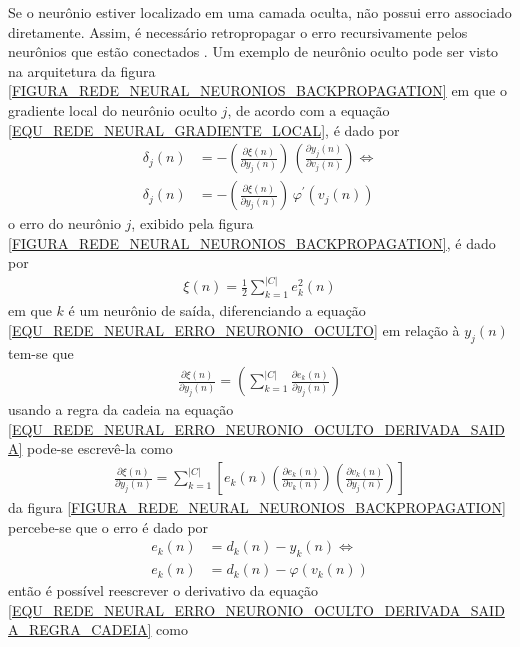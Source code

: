 Se o neurônio estiver localizado em uma camada oculta, não possui erro associado diretamente. Assim, é necessário retropropagar o erro recursivamente pelos neurônios que estão conectados \cite{Haykin2007}. Um exemplo de neurônio oculto pode ser visto na arquitetura da figura \ref{FIGURA_REDE_NEURAL_NEURONIOS_BACKPROPAGATION} em que o gradiente local do neurônio oculto \(j\), de acordo com a equação \eqref{EQU_REDE_NEURAL_GRADIENTE_LOCAL}, é dado por
\begin{align}
\delta_{j}(n) &= - \left( \frac{\partial \xi(n)}{\partial y_{j}(n)} \right) \, \left( \frac{\partial y_{j}(n)}{\partial v_{j}(n)} \right) \Leftrightarrow \label{EQU_REDE_NEURAL_GRADIENTE_LOCAL_CASO2}\\
\delta_{j}(n) &= - \left( \frac{\partial \xi(n)}{\partial y_{j}(n)} \right) \, \varphi^{'}(v_{j}(n))
\end{align}
o erro do neurônio \(j\), exibido pela figura \ref{FIGURA_REDE_NEURAL_NEURONIOS_BACKPROPAGATION}, é dado por
\begin{align}
\xi(n) = \frac{1}{2} \sum\limits_{k = 1}^{|C|} e_{k}^{2}(n) \label{EQU_REDE_NEURAL_ERRO_NEURONIO_OCULTO}
\end{align}
em que \(k\) é um neurônio de saída, diferenciando a equação \eqref{EQU_REDE_NEURAL_ERRO_NEURONIO_OCULTO} em relação à \(y_{j}(n)\) tem-se que
\begin{align}
\frac{\partial \xi(n)}{\partial y_{j}(n)} =  \left( \sum\limits_{k = 1}^{|C|} \frac{\partial e_{k}(n)}{\partial y_{j}(n)} \right)  \label{EQU_REDE_NEURAL_ERRO_NEURONIO_OCULTO_DERIVADA_SAIDA}
\end{align}
usando a regra da cadeia na equação \eqref{EQU_REDE_NEURAL_ERRO_NEURONIO_OCULTO_DERIVADA_SAIDA} pode-se escrevê-la como
\begin{align}
\frac{\partial \xi(n)}{\partial y_{j}(n)} = \sum\limits_{k = 1}^{|C|} \left[ e_{k}(n) \left( \frac{\partial e_{k}(n)}{\partial v_{k}(n)} \right) \left( \frac{\partial v_{k}(n)}{\partial y_{j}(n)} \right) \right]  \label{EQU_REDE_NEURAL_ERRO_NEURONIO_OCULTO_DERIVADA_SAIDA_REGRA_CADEIA}
\end{align}
da figura \ref{FIGURA_REDE_NEURAL_NEURONIOS_BACKPROPAGATION} percebe-se que o erro é dado por
\begin{align}
e_{k}(n) &= d_{k}(n) - y_{k}(n) \Leftrightarrow \\
e_{k}(n) &= d_{k}(n) - \varphi(v_{k}(n))
\end{align}
então é possível reescrever o derivativo da equação \eqref{EQU_REDE_NEURAL_ERRO_NEURONIO_OCULTO_DERIVADA_SAIDA_REGRA_CADEIA} como
